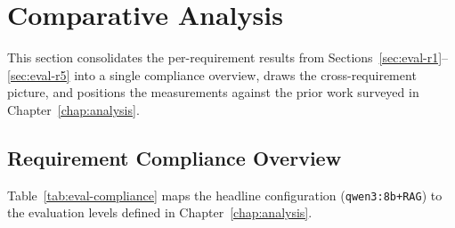 \section{Comparative Analysis}
\label{sec:eval-comparative}

This section consolidates the per-requirement results from Sections~\ref{sec:eval-r1}--\ref{sec:eval-r5} into a single compliance overview, draws the cross-requirement picture, and positions the measurements against the prior work surveyed in Chapter~\ref{chap:analysis}.

\subsection{Requirement Compliance Overview}

Table~\ref{tab:eval-compliance} maps the headline configuration (\texttt{qwen3:8b+RAG}) to the evaluation levels defined in Chapter~\ref{chap:analysis}.

